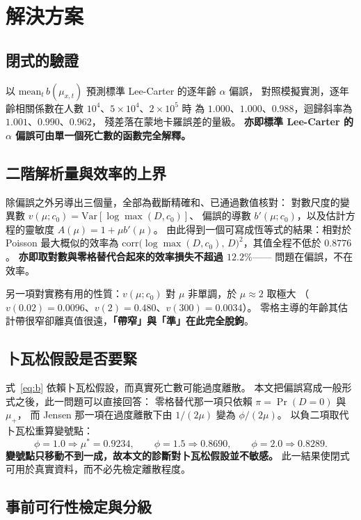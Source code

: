\documentclass[UTF8, fontset=macnew, a4paper, 12pt]{ctexart}
\begin{document}
\section{解決方案}\label{s:sol}

\subsection{閉式的驗證}

以 $\mathrm{mean}_t\,b(\mu_{x,t})$ 預測標準 Lee-Carter 的逐年齡 $\alpha$ 偏誤，
對照模擬實測，逐年齡相關係數在人數 $10^4$、$5\times10^4$、$2\times10^5$ 時
為 $1.000$、$1.000$、$0.988$，迴歸斜率為 $1.001$、$0.990$、$0.962$，
殘差落在蒙地卡羅誤差的量級。
\textbf{亦即標準 Lee-Carter 的 $\alpha$ 偏誤可由單一個死亡數的函數完全解釋。}

\subsection{二階解析量與效率的上界}

除偏誤之外另導出三個量，全部為截斷精確和、已通過數值核對：
對數尺度的變異數 $v(\mu;c_0)=\mathrm{Var}[\log\max(D,c_0)]$、
偏誤的導數 $b'(\mu;c_0)$，以及估計方程的靈敏度 $A(\mu)=1+\mu b'(\mu)$。
由此得到一個可寫成恆等式的結果：相對於 Poisson 最大概似的效率為
$\mathrm{corr}\big(\log\max(D,c_0),\,D\big)^2$，其值全程不低於 $0.8776$。
\textbf{亦即取對數與零格替代合起來的效率損失不超過 $12.2\%$}——
問題在偏誤，不在效率。

另一項對實務有用的性質：$v(\mu;c_0)$ 對 $\mu$ 非單調，於 $\mu\approx2$ 取極大
（$v(0.02)=0.0096$、$v(2)=0.480$、$v(300)=0.0034$）。
零格主導的年齡其估計帶很窄卻離真值很遠，\textbf{「帶窄」與「準」在此完全脫鉤}。

\subsection{卜瓦松假設是否要緊}

式~\eqref{eq:b} 依賴卜瓦松假設，而真實死亡數可能過度離散。
本文把偏誤寫成一般形式之後，此一問題可以直接回答：
零格替代那一項只依賴 $\pi=\Pr(D=0)$ 與 $\mu_+$，
而 Jensen 那一項在過度離散下由 $1/(2\mu)$ 變為 $\phi/(2\mu)$。
以負二項取代卜瓦松重算變號點：
$$\phi=1.0\Rightarrow\mu^{\ast}=0.9234,\qquad
\phi=1.5\Rightarrow0.8690,\qquad
\phi=2.0\Rightarrow0.8289 .$$
\textbf{變號點只移動不到一成，故本文的診斷對卜瓦松假設並不敏感。}
此一結果使閉式可用於真實資料，而不必先檢定離散程度。

\subsection{事前可行性檢定與分級}
\end{document}
